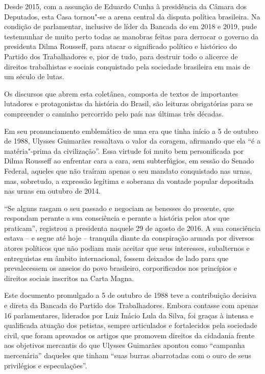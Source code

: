 Desde 2015, com a assunção de Eduardo Cunha à presidência da Câmara dos
Deputados, esta Casa tornou"-se a arena central da disputa política
brasileira. Na condição de parlamentar, inclusive de líder da Bancada do
 em 2018 e 2019, pude testemunhar de muito perto todas as manobras
feitas para derrocar o governo da presidenta Dilma Rousseff, para atacar
o significado político e histórico do Partido dos Trabalhadores e, pior
de tudo, para destruir todo o alicerce de direitos trabalhistas e
sociais conquistado pela sociedade brasileira em mais de um século de
lutas.

Os discursos que abrem esta coletânea, composta de textos de importantes
lutadores e protagonistas da história do Brasil, são leituras
obrigatórias para se compreender o caminho percorrido pelo país nas
últimas três décadas.

Em seu pronunciamento emblemático de uma era que tinha início a 5 de
outubro de 1988, Ulysses Guimarães ressaltava o valor da coragem,
afirmando que ela ``é a matéria"-prima da civilização''. Essa virtude foi
muito bem personificada por Dilma Rousseff ao enfrentar cara a cara, sem
subterfúgios, em sessão do Senado Federal, aqueles que não traíram
apenas o seu mandato conquistado nas urnas, mas, sobretudo, a expressão
legítima e soberana da vontade popular depositada nas urnas em outubro
de 2014.

``Se alguns rasgam o seu passado e negociam as benesses do presente, que
respondam perante a sua consciência e perante a história pelos atos que
praticam'', registrou a presidenta naquele 29 de agosto de 2016. A sua
consciência estava -- e segue até hoje -- tranquila diante da
conspiração armada por diversos atores políticos que não podiam mais
aceitar que seus interesses, subalternos e entreguistas em âmbito
internacional, fossem deixados de lado para que prevalecessem os anseios
do povo brasileiro, corporificados nos princípios e direitos sociais
inscritos na Carta Magna.

Este documento promulgado a 5 de outubro de 1988 teve a contribuição
decisiva e direta da Bancada do Partido dos Trabalhadores. Embora
contasse com apenas 16 parlamentares, liderados por Luiz Inácio Lula da
Silva, foi graças à intensa e qualificada atuação dos petistas, sempre
articulados e fortalecidos pela sociedade civil, que foram aprovados os
artigos que promovem direitos da cidadania frente aos objetivos
mercantis do que Ulysses Guimarães apontou como ``campanha mercenária''
daqueles que tinham ``suas burras abarrotadas com o ouro de seus
privilégios e especulações''.

